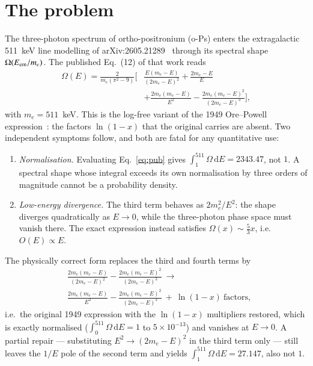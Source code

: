 \documentclass[letter]{aa}
\begin{document}
\section{The problem}
The three-photon spectrum of ortho-positronium (o-Ps) enters the
extragalactic 511~keV line modelling of
arXiv:2605.21289~\citep{sy26} through its spectral shape
$\Omega(E_{\rm em}/m_e)$. The published Eq.~(12) of that work reads
\begin{equation}
\label{eq:pub}
\begin{split}
\Omega(E) = \frac{2}{m_e(\pi^2-9)}\biggl[&
\frac{E(m_e-E)}{(2m_e-E)^2} + \frac{2m_e-E}{E} \\
&+ \frac{2m_e(m_e-E)}{E^2}
- \frac{2m_e(m_e-E)^2}{(2m_e-E)^3}\biggr],
\end{split}
\end{equation}
with $m_e = 511$~keV. This is the log-free variant of the 1949
Ore--Powell expression~\citet{ore49}: the factors
$\ln(1-x)$ that the original carries are absent. Two independent
symptoms follow, and both are fatal for any quantitative use:
\begin{enumerate}
    \item \emph{Normalisation.} Evaluating Eq.~\eqref{eq:pub} gives
    $\int_{1}^{511}\Omega\,\mathrm{d}E = 2343.47$, not $1$. A spectral
    shape whose integral exceeds its own normalisation by three orders
    of magnitude cannot be a probability density.
    \item \emph{Low-energy divergence.} The third term behaves as
    $2m_e^2/E^2$: the shape diverges quadratically as $E\to 0$, while
    the three-photon phase space must vanish there. The exact
    expression instead satisfies $\Omega(x)\sim\tfrac{5}{3}x$, i.e.\
    $O(E)\propto E$.
\end{enumerate}
The physically correct form replaces the third and fourth terms by
\begin{equation}
\label{eq:corr}
\begin{split}
&\frac{2m_e(m_e-E)}{(2m_e-E)^2}
- \frac{2m_e(m_e-E)^2}{(2m_e-E)^3}
\ \longrightarrow\ \\
&\frac{2m_e(m_e-E)}{E^2}
- \frac{2m_e(m_e-E)^2}{(2m_e-E)^3}
\ +\ \ln(1-x)\ \text{factors},
\end{split}
\end{equation}
i.e.\ the original 1949 expression with the
$\ln(1-x)$ multipliers restored, which is exactly normalised
($\int_0^{511}\Omega\,\mathrm{d}E = 1$ to $5\times10^{-13}$) and
vanishes at $E\to 0$. A partial repair --- substituting
$E^2\to(2m_e-E)^2$ in the third term only --- still leaves the
$1/E$ pole of the second term and yields
$\int_{1}^{511}\Omega\,\mathrm{d}E = 27.147$, also not $1$.
\end{document}
